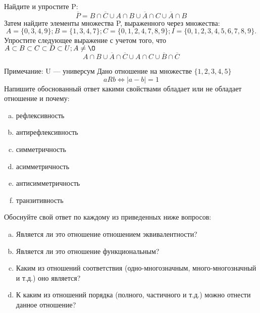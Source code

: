 \documentclass[10pt]{exam}
\begin{document}
\begin{questions}
\question
Найдите и упростите P:
\begin{equation*}
\overline{P} = B \cap \overline{C} \cup A \cap B \cup \overline{A} \cap C \cup \overline{A} \cap B
\end{equation*}
Затем найдите элементы множества P, выраженного через множества:
\begin{equation*}
A = \{0, 3, 4, 9\}; 
B = \{1, 3, 4, 7\};
C = \{0, 1, 2, 4, 7, 8, 9\};
I = \{0, 1, 2, 3, 4, 5, 6, 7, 8, 9\}.
\end{equation*}\question
Упростите следующее выражение с учетом того, что $A\subset B \subset C \subset D \subset U; A \neq \O$
\begin{equation*}
A \cap B \cup \overline{A} \cap \overline{C} \cup A \cap C \cup \overline{B} \cap \overline{C}
\end{equation*}

Примечание: U — универсум\question
Дано отношение на множестве $\{1, 2, 3, 4, 5\}$ 
\begin{equation*}
aRb \iff |a-b| = 1
\end{equation*}
Напишите обоснованный ответ какими свойствами обладает или не обладает отношение и почему:   
\begin{enumerate} [a)]\setcounter{enumi}{0}
\item рефлексивность
\item антирефлексивность
\item симметричность
\item асимметричность
\item антисимметричность
\item транзитивность
\end{enumerate}

Обоснуйте свой ответ по каждому из приведенных ниже вопросов:
\begin{enumerate} [a)]\setcounter{enumi}{0}
    \item Является ли это отношение отношением эквивалентности?
    \item Является ли это отношение функциональным?
    \item Каким из отношений соответствия (одно-многозначным, много-многозначный и т.д.) оно является?
    \item К каким из отношений порядка (полного, частичного и т.д.) можно отнести данное отношение?
\end{enumerate}


\end{questions}
\end{document}
